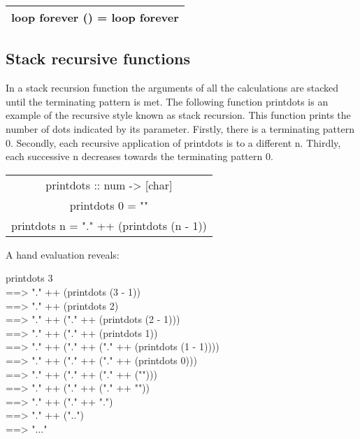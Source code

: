\documentclass[11pt]{article}
\begin{document}
\begin{center}
    \begin{tabular}{|c|}
    \hline
loop forever () = loop forever \\

\hline
    \end{tabular}
\end{center}






\subsection{Stack recursive functions}

In a stack recursion function the arguments of all the calculations are stacked until the terminating pattern is met. The following function printdots is an example of the recursive style known as
stack recursion. This function prints the number of dots indicated by its parameter.
Firstly, there is a terminating pattern 0. Secondly, each recursive application of
printdots is to a different n. Thirdly, each successive n decreases towards the
terminating pattern 0.



\begin{center}
    \begin{tabular}{|c|}
    \hline
    printdots :: num -> [char]\\
printdots 0 = ""\\
printdots n = "." ++ (printdots (n - 1))\\
\hline
    \end{tabular}
\end{center}

A hand evaluation reveals:

\begin{flushleft}
printdots 3\\
==> "." ++ (printdots (3 - 1))\\
==> "." ++ (printdots 2)\\
==> "." ++ ("." ++ (printdots (2 - 1)))\\
==> "." ++ ("." ++ (printdots 1))\\
==> "." ++ ("." ++ ("." ++ (printdots (1 - 1))))\\
==> "." ++ ("." ++ ("." ++ (printdots 0)))\\
==> "." ++ ("." ++ ("." ++ ("")))\\
==> "." ++ ("." ++ ("." ++ ""))\\
==> "." ++ ("." ++ ".")\\
==> "." ++ ("..")\\
==> "..."

\end{flushleft}
\end{document}
